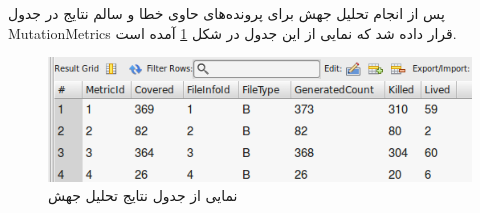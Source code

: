  پس از انجام تحلیل جهش برای پرونده‌های حاوی خطا و سالم نتایج در جدول MutationMetrics قرار داده شد که نمایی از این جدول در شکل \ref{fig:mutation-metrics}  آمده است. 
 
 
 \begin{figure}[H]
 	\centering
 	\includegraphics[width=.7\textwidth]{img/case_study/mutation-metrics.png}
 	\caption{نمایی از جدول نتایج تحلیل جهش}
 	\label{fig:mutation-metrics}
 \end{figure}
 